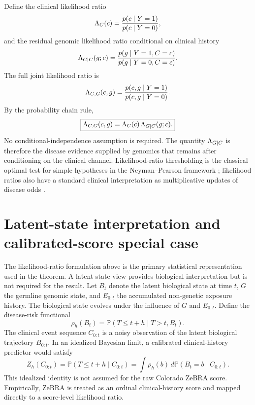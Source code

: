 Define the clinical likelihood ratio
\begin{equation}
\Lambda_C(c)=\frac{p(c\mid Y=1)}{p(c\mid Y=0)},
\label{eq:clinicalLR}
\end{equation}
and the residual genomic likelihood ratio conditional on clinical history
\begin{equation}
\Lambda_{G\mid C}(g;c)
=\frac{p(g\mid Y=1,C=c)}{p(g\mid Y=0,C=c)}.
\label{eq:conditionalGLR}
\end{equation}
The full joint likelihood ratio is
\begin{equation}
\Lambda_{C,G}(c,g)
=\frac{p(c,g\mid Y=1)}{p(c,g\mid Y=0)}.
\end{equation}
By the probability chain rule,
\begin{equation}
\boxed{
\Lambda_{C,G}(c,g)
=\Lambda_C(c)\,\Lambda_{G\mid C}(g;c).
}
\label{eq:factorization}
\end{equation}
No conditional-independence assumption is required. The quantity $\Lambda_{G\mid C}$ is therefore the disease evidence supplied by genomics that remains after conditioning on the clinical channel. Likelihood-ratio thresholding is the classical optimal test for simple hypotheses in the Neyman--Pearson framework \cite{NeymanPearson1933}; likelihood ratios also have a standard clinical interpretation as multiplicative updates of disease odds \cite{DeeksAltman2004}.

\section{Latent-state interpretation and calibrated-score special case}

The likelihood-ratio formulation above is the primary statistical representation used in the theorem. A latent-state view provides biological interpretation but is not required for the result. Let $B_t$ denote the latent biological state at time $t$, $G$ the germline genomic state, and $E_{0:t}$ the accumulated non-genetic exposure history. The biological state evolves under the influence of $G$ and $E_{0:t}$. Define the disease-risk functional
\begin{equation}
\rho_h(B_t)
=\mathbb{P}(T\le t+h\mid T>t,B_t).
\label{eq:rho}
\end{equation}
The clinical event sequence $C_{0:t}$ is a noisy observation of the latent biological trajectory $B_{0:t}$. In an idealized Bayesian limit, a calibrated clinical-history predictor would satisfy
\begin{equation}
Z_h(C_{0:t})
=\mathbb{P}(T\le t+h\mid C_{0:t})
=\int \rho_h(b)\,d\mathbb{P}(B_t=b\mid C_{0:t}).
\label{eq:zposterior}
\end{equation}
This idealized identity is not assumed for the raw Colorado ZeBRA score. Empirically, ZeBRA is treated as an ordinal clinical-history score and mapped directly to a score-level likelihood ratio.

